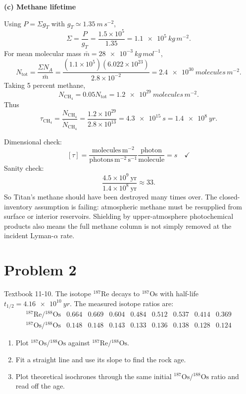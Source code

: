 \documentclass[11pt]{article}
\begin{document}
\textbf{(c) Methane lifetime}

Using $P=\Sigma g_T$ with $g_T\simeq\SI{1.35}{m\,s^{-2}}$,
\[
\Sigma=\frac{P}{g_T}
=\frac{1.5\times 10^5}{1.35}
=\SI{1.1e5}{kg\,m^{-2}}.
\]
For mean molecular mass $\bar m=\SI{28e-3}{kg\,mol^{-1}}$,
\[
N_{\mathrm{tot}}=\frac{\Sigma N_A}{\bar m}
=\frac{(1.1\times 10^5)(6.022\times 10^{23})}{2.8\times 10^{-2}}
=\SI{2.4e30}{molecules\,m^{-2}}.
\]
Taking 5 percent methane,
\[
N_{\mathrm{CH_4}}=0.05N_{\mathrm{tot}}
=\SI{1.2e29}{molecules\,m^{-2}}.
\]
Thus
\[
\tau_{\mathrm{CH_4}}
=\frac{N_{\mathrm{CH_4}}}{\dot N_{\mathrm{CH_4}}}
=\frac{1.2\times 10^{29}}{2.8\times 10^{13}}
=\SI{4.3e15}{s}
=\boxed{\SI{1.4e8}{yr}}.
\]

Dimensional check:
\[
[\tau]=
\frac{\mathrm{molecules\,m^{-2}}}
{\mathrm{photons\,m^{-2}\,s^{-1}}}
\frac{\mathrm{photon}}{\mathrm{molecule}}
=\si{s}\quad \checkmark
\]
Sanity check:
\[
\frac{4.5\times 10^9\ \mathrm{yr}}{1.4\times 10^8\ \mathrm{yr}}\approx 33.
\]
So Titan's methane should have been destroyed many times over. The closed-inventory assumption
is failing: atmospheric methane must be resupplied from surface or interior reservoirs. Shielding
by upper-atmosphere photochemical products also means the full methane column is not simply
removed at the incident Lyman-$\alpha$ rate.

\newpage
\section*{Problem 2}
Textbook 11-10. The isotope $^{187}$Re decays to $^{187}$Os with half-life
$t_{1/2}=\SI{4.16e10}{yr}$. The measured isotope ratios are:
\[
\begin{array}{c|cccccccc}
{}^{187}\mathrm{Re}/{}^{188}\mathrm{Os}
&0.664&0.669&0.604&0.484&0.512&0.537&0.414&0.369\\
\hline
{}^{187}\mathrm{Os}/{}^{188}\mathrm{Os}
&0.148&0.148&0.143&0.133&0.136&0.138&0.128&0.124
\end{array}
\]
\begin{enumerate}[label=(\alph*)]
\item Plot $^{187}\mathrm{Os}/{}^{188}\mathrm{Os}$ against
$^{187}\mathrm{Re}/{}^{188}\mathrm{Os}$.
\item Fit a straight line and use its slope to find the rock age.
\item Plot theoretical isochrones through the same initial
$^{187}\mathrm{Os}/{}^{188}\mathrm{Os}$ ratio and read off the age.
\end{enumerate}
\end{document}
